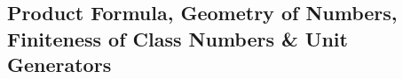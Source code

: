 \newpage
\subsection{Product Formula, Geometry of Numbers, Finiteness of Class Numbers \& Unit Generators\label{sec:620_19}}